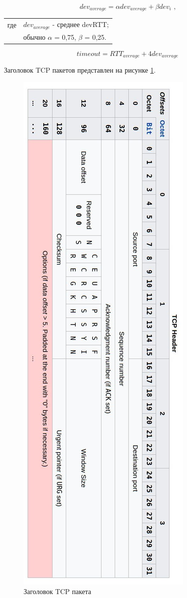 \documentclass[14pt, a4paper]{extarticle}
\begin{document}
\begin{equation}
	dev_{average} =\alpha dev_{average} + \beta{dev_{i}} \text{ ,} 
\end{equation}
\begin{tabular}{rl}
	где & $dev_{average}$ - среднее devRTT; \\
	& обычно $\alpha$ = 0,75, $\beta$ = 0,25.
\end{tabular}

\begin{equation}
	timeout =  RTT_{average} + 4 dev_{average}
\end{equation}

Заголовок\cite{tcpheader} TCP пакетов представлен на рисунке \ref{tcp-header}.
\begin{figure}[H]
	\centering
	\includegraphics[scale=0.6]{tcpheader.jpg}
	\caption{Заголовок TCP пакета}
	\label{tcp-header}
\end{figure}
\end{document}

